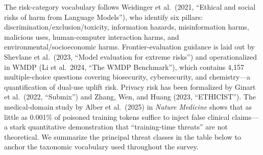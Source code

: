 The risk-category vocabulary follows Weidinger et al.~(2021, ``Ethical and social risks of harm from Language Models''), who identify six pillars: discrimination/exclusion/toxicity, information hazards, misinformation harms, malicious uses, human-computer interaction harms, and environmental/socioeconomic harms. Frontier-evaluation guidance is laid out by Shevlane et al.~(2023, ``Model evaluation for extreme risks'') and operationalized in WMDP (Li et al.~2024, ``The WMDP Benchmark''), which contains 4,157 multiple-choice questions covering biosecurity, cybersecurity, and chemistry---a quantification of dual-use uplift risk. Privacy risk has been formalized by Ginart et al.~(2022, ``Submix'') and Zhang, Wen, and Huang (2023, ``ETHICIST''). The medical-domain study by Alber et al.~(2025) in \emph{Nature Medicine} shows that as little as 0.001\% of poisoned training tokens suffice to inject false clinical claims---a stark quantitative demonstration that ``training-time threats'' are not theoretical. We summarize the principal threat classes in the table below to anchor the taxonomic vocabulary used throughout the survey.

